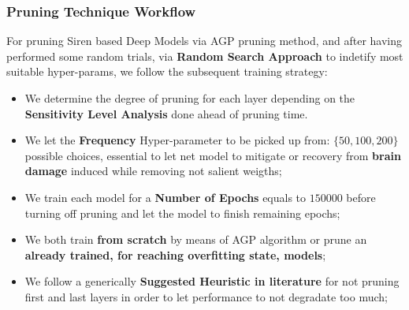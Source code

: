 



\begin{frame}
\frametitle{Pruning Technique Workflow}
For pruning Siren based Deep Models via AGP pruning method, and after having performed some random trials, via \textbf{Random Search Approach} to indetify most suitable hyper-params, we follow the subsequent training strategy:
\begin{itemize}
\item We determine the degree of pruning for each layer depending on the \textbf{Sensitivity Level Analysis} done ahead of pruning time.
\item We let the \textbf{Frequency} Hyper-parameter to be picked up from: $\{50, 100, 200\}$ possible choices, essential to let net model to mitigate or recovery from \textbf{brain damage} induced while removing not salient weigths;
\item We train each model for a \textbf{Number of Epochs} equals to $150000$ before turning off pruning and let the model to finish remaining epochs;
\item We both train \textbf{from scratch} by means of AGP algorithm or prune an \textbf{already trained, for reaching overfitting state, models};
\item We follow a generically \textbf{Suggested Heuristic in literature} for not pruning first and last layers in order to let performance to not degradate too much;
\end{itemize}

\end{frame}
